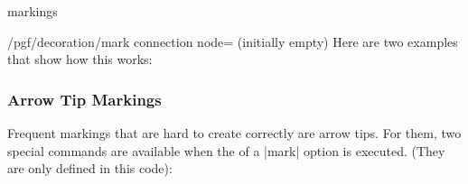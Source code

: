 \begin{decoration}{markings}
\begin{key}{/pgf/decoration/mark connection node= (initially empty)}
        Here are two examples that show how this works:
\begin{codeexample}[]
\end{codeexample}

\begin{codeexample}[]
\end{codeexample}
    \end{key}
\end{decoration}


\subsubsection{Arrow Tip Markings}

Frequent markings that are hard to create correctly are arrow tips. For them,
two special commands are available when the  of a |mark| option is
executed. (They are only defined in this code):

